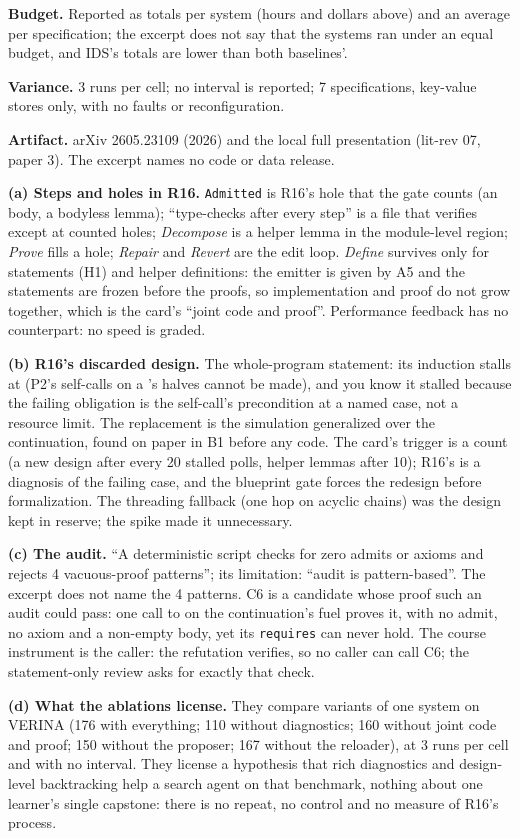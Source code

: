 \documentclass[11pt]{article}
\begin{document}
\begin{answer}
\textbf{Budget.} Reported as totals per system (hours and dollars above) and
an average per specification; the excerpt does not say that the systems ran
under an equal budget, and IDS's totals are lower than both baselines'.

\textbf{Variance.} 3 runs per cell; no interval is reported; 7 specifications,
key-value stores only, with no faults or reconfiguration.

\textbf{Artifact.} arXiv 2605.23109 (2026) and the local full presentation
(lit-rev 07, paper 3). The excerpt names no code or data release.

\textbf{(a) Steps and holes in R16.} \texttt{Admitted} is R16's hole that the
gate counts (an  body, a bodyless lemma); ``type-checks after
every step'' is a file that verifies except at counted holes; \emph{Decompose}
is a helper lemma in the module-level region; \emph{Prove} fills a hole;
\emph{Repair} and \emph{Revert} are the edit loop. \emph{Define} survives only
for statements (H1) and helper definitions: the emitter is given by A5 and the
statements are frozen before the proofs, so implementation and proof do not
grow together, which is the card's ``joint code and proof''. Performance
feedback has no counterpart: no speed is graded.

\textbf{(b) R16's discarded design.} The whole-program statement: its
induction stalls at  (P2's self-calls on a 's halves cannot
be made), and you know it stalled because the failing obligation is the
self-call's precondition at a named case, not a resource limit. The
replacement is the simulation generalized over the continuation, found on
paper in B1 before any code. The card's trigger is a count (a new design after
every 20 stalled polls, helper lemmas after 10); R16's is a diagnosis of the
failing case, and the blueprint gate forces the redesign before
formalization. The threading fallback (one hop on acyclic chains) was the
design kept in reserve; the spike made it unnecessary.

\textbf{(c) The audit.} ``A deterministic script checks for zero admits or
axioms and rejects 4 vacuous-proof patterns''; its limitation: ``audit is
pattern-based''. The excerpt does not name the 4 patterns. C6 is a candidate
whose proof such an audit could pass: one call to  on the
continuation's fuel proves it, with no admit, no axiom and a non-empty body,
yet its \texttt{requires} can never hold. The course instrument is the caller:
the refutation  verifies, so no caller can call
C6; the statement-only review asks for exactly that check.

\textbf{(d) What the ablations license.} They compare variants of one system
on VERINA (176 with everything; 110 without diagnostics; 160 without joint code
and proof; 150 without the proposer; 167 without the reloader), at 3 runs per
cell and with no interval. They license a hypothesis that rich diagnostics and
design-level backtracking help a search agent on that benchmark, nothing about
one learner's single capstone: there is no repeat, no control and no measure of
R16's process.
\end{answer}
\end{document}
